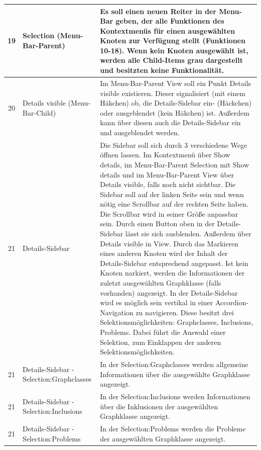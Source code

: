 \documentclass[11pt,a4paper]{article}
\begin{document}
\begin{tabular}{|c|p{5cm}|p{10cm}|}
\hline 
19 & Selection (Menu-Bar-Parent) & Es soll einen neuen Reiter in der Menu-Bar geben, der alle Funktionen des Kontextmenüs für einen ausgewählten Knoten zur Verfügung stellt (Funktionen 10-18). Wenn kein Knoten ausgewählt ist, werden alle Child-Items grau dargestellt und besitzten keine Funktionalität.  \\
\hline
20 & Details visible (Menu-Bar-Child) & Im Menu-Bar-Parent View soll ein Punkt Details visible existieren. Dieser signalisiert (mit einem Häkchen) ob, die Details-Sidebar ein- (Häckchen) oder ausgeblendet (kein Häkchen) ist. Außerdem kann über diesen auch die Details-Sidebar ein und ausgeblendet werden.\\ 
\hline
21 & Details-Sidebar & Die Sidebar soll sich durch 3 verschiedene Wege öffnen lassen. Im Kontextmenü über Show details, im Menu-Bar-Parent Selection mit Show details und im Menu-Bar-Parent View über Details visible, falls noch nicht sichtbar. Die Sidebar soll auf der linken Seite sein und wenn nötig eine Scrollbar auf der rechten Seite haben. Die Scrollbar wird in seiner Größe anpassbar sein. Durch einen Button oben in der Details-Sidebar lässt sie sich ausblenden. Außerdem über Details visible in View. Durch das Markieren eines anderen Knoten wird der Inhalt der Details-Sidebar entsprechend angepasst. Ist kein Knoten narkiert, werden die Informationen der zuletzt ausgewählten Graphklasse (falls vorhanden) angezeigt. In der Details-Sidebar wird es möglich sein vertikal in einer Accordion-Navigation zu navigieren. Diese besitzt drei Selektionsmöglichkeiten: Graphclasses, Inclusions, Problems. Dabei führt die Auswahl einer Selektion, zum Einklappen der anderen Selektionsmöglichkeiten. \\
\hline
21 & Details-Sidebar - Selection:Graphclasses  & In der Selection:Graphclasses werden allgemeine Informationen über die ausgewählte Graphklasse angezeigt. \\
\hline
21 & Details-Sidebar - Selection:Inclusions & In der Selection:Inclusions werden Informationen über die Inklusionen der ausgewählten Graphklasse angezeigt. \\
\hline
21 & Details-Sidebar - Selection:Problems & In der Selection:Problems werden die Probleme der ausgewählten Graphklasse angezeigt. \\
\hline
\end{tabular} \newpage
\end{document}
